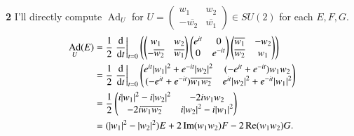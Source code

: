 \documentclass[a4paper, 12pt]{article}
\theoremstyle{Mydefinition}
\theoremstyle{Mytheorem}
\DeclareMathOperator{\Ad}{Ad}
\begin{document}
\noindent \textbf{2}
I'll directly compute $\Ad_U$ for $U=\begin{pmatrix}
    w_1 & w_2\\
    -\overline{w_2} & \overline{w_1}
\end{pmatrix}\in \mathit{SU}(2)$ for each $E,F,G$.
\begin{equation*}
\begin{split}
    \Ad_U(E) &= \frac{1}{2}\left.\dv{t}\right|_{t=0}\left(\begin{pmatrix}
        w_1 & w_2 \\
        -\overline{w_2} & \overline{w_1}
    \end{pmatrix}
    \begin{pmatrix}
        e^{it} & 0\\
        0 & e^{-it}
    \end{pmatrix}
    \begin{pmatrix}
        \overline{w_1} & -w_2 \\
        \overline{w_2} & w_1
    \end{pmatrix}\right) \\
    &=\frac{1}{2}\left.\dv{t}\right|_{t=0}\begin{pmatrix}
        e^{it}\abs{w_1}^2 + e^{-it}\abs{w_2}^2 & (-e^{it} + e^{-it})w_1w_2\\
        (-e^{it}+e^{-it})\overline{w_1w_2} & e^{it}\abs{w_2}^2+e^{-it}\abs{w_1}^2
    \end{pmatrix}\\
    &=\frac{1}{2}\begin{pmatrix}
        i\abs{w_1}^2-i\abs{w_2}^2 & -2iw_1w_2 \\
        -2i\overline{w_1w_2} & i\abs{w_2}^2 - i \abs{w_1}^2
    \end{pmatrix}\\
    &=(\abs{w_1}^2-\abs{w_2}^2)E + 2\Im(w_1w_2)F - 2\Re(w_1w_2)G.
\end{split}
\end{equation*}
\end{document}

